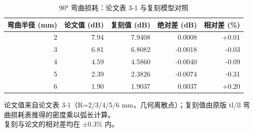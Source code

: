 \begin{table}[htbp]
  \centering
  \caption{90° 弯曲损耗：论文表 3-1 与复刻模型对照}
  \label{tab:bend-thesis}
  \begin{tabular}{rrrrr}
    \toprule
    弯曲半径 (mm) & 论文值 (dB) & 复刻值 (dB) & 绝对差 (dB) & 相对差 (\%) \\
    \midrule
    2 & 7.94 & 7.9408 & 0.0008 & +0.01 \\
    3 & 6.81 & 6.8082 & -0.0018 & -0.03 \\
    4 & 4.59 & 4.5860 & -0.0040 & -0.09 \\
    5 & 2.39 & 2.3826 & -0.0074 & -0.31 \\
    6 & 1.90 & 1.9037 & 0.0037 & +0.20 \\
    \bottomrule
  \end{tabular}
  \par\vspace{2pt}
  \begin{flushleft}\footnotesize
  论文值来自论文表 3-1（R=2/3/4/5/6 mm，几何离散点）；复刻值由原版 tl/ll 弯曲损耗表推得的密度乘以弧长计算。 \\
  复刻与论文的相对差均在 ±0.3\% 内。 \\
  \end{flushleft}
\end{table}
